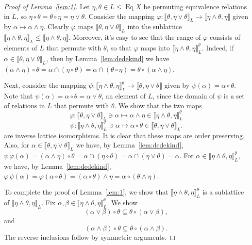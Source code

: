 \documentclass[11pt,reqno]{amsart}
\theoremstyle{plain}
\theoremstyle{definition}
\theoremstyle{remark}
\newcommand{\<}{\ensuremath{\langle}}
\renewcommand{\>}{\ensuremath{\rangle}}
\renewcommand{\phi}{\ensuremath{\varphi}}
\newcommand{\lb}{\ensuremath{\llbracket}}
\newcommand{\rb}{\ensuremath{\rrbracket}}
\renewcommand{\leq}{\ensuremath{\leqslant}}
\newcommand{\meet}{\ensuremath{\wedge}}
\newcommand{\join}{\ensuremath{\vee}}
\newcommand{\Eq}{\ensuremath{\operatorname{Eq}}}
\begin{document}
\begin{proof}[Proof of Lemma~\ref{lem:1}]
Let $\eta, \theta \in L\leq \Eq X$ be permuting equivalence relations in $L$, 
so $\eta \circ \theta = \theta \circ \eta = \eta \join \theta$.
Consider the mapping
$\phi : \lb\theta, \eta \join \theta\rb_L \rightarrow \lb\eta \meet \theta,\eta\rb$ 
given by 
$\alpha \mapsto \alpha \meet \eta$.  Clearly $\phi$ maps $\lb\theta, \eta \join \theta\rb_L$ into the sublattice
$\lb\eta \meet \theta,\eta\rb_L \leq \lb\eta \meet \theta,\eta\rb$.  Moreover,
it's easy to see that the range of $\phi$
consists of elements of $L$ that permute with $\theta$, so that 
$\phi$ maps 
into $\lb\eta \meet \theta, \eta\rb_L^\theta$.
Indeed, if $\alpha \in \lb \theta, \eta 
\join \theta\rb_L$, then by 
Lemma~\ref{lem:dedekind} we have
$(\alpha \meet \eta) \circ \theta = \alpha \cap (\eta\circ \theta) = \alpha \cap
(\theta \circ \eta) = \theta \circ (\alpha \meet \eta)$.

Next, consider the mapping $\psi : \lb \eta\meet \theta, \eta \rb_L^\theta
\rightarrow \lb\theta, \eta\join \theta\rb$ given by $\psi(\alpha) = \alpha
\circ \theta$.  Note that $\psi(\alpha) = \alpha \circ \theta = \alpha \join
\theta$, an element of $L$, since the domain of $\psi$ is a set of
relations in $L$ that permute with $\theta$.
We show that the two maps
\begin{equation}
  \label{eq:phi}
\phi : \lb\theta, \eta \join \theta\rb_L \ni \alpha \longmapsto 
\alpha \meet \eta  \in \lb\eta \meet \theta, \eta\rb_L^\theta
\end{equation}
\begin{equation}
  \label{eq:psi}
\psi :  \lb\eta \meet \theta, \eta\rb^\theta_L \ni \alpha \longmapsto \alpha \circ \theta \in
\lb\theta, \eta \join \theta\rb_L.
\end{equation}
are inverse lattice isomorphisms.  It is clear that these maps are order preserving.
Also, for $\alpha \in \lb\theta, \eta \join \theta\rb_L$ we have, by Lemma~\ref{lem:dedekind},
$\psi\, \phi(\alpha) = (\alpha \meet \eta)\circ \theta = 
\alpha \cap (\eta\circ \theta) = 
\alpha \cap (\eta\join \theta) = \alpha$. For
$\alpha \in \lb\eta \meet \theta, \eta\rb_L^\theta$, we have, by Lemma~\ref{lem:dedekind},
$\phi\, \psi(\alpha) = \phi(\alpha\circ \theta) =  (\alpha
\circ \theta) \meet \eta = \alpha \circ (\theta \meet \eta)$.

To complete the proof of Lemma~\ref{lem:1}, we show that
$\lb\eta \meet \theta, \eta\rb_L^\theta$ is a sublattice of $\lb\eta \meet \theta,
\eta\rb_L$.
Fix $\alpha, \beta \in \lb\eta \meet \theta, \eta\rb_L^\theta$.  We show
\begin{equation}
  \label{eq:i}
  (\alpha \join \beta) \circ \theta \subseteq \theta\circ (\alpha \join \beta),
\end{equation}
and
\begin{equation}
  \label{eq:ii}
  (\alpha \meet \beta) \circ \theta \subseteq \theta\circ (\alpha \meet \beta).
\end{equation}
The reverse inclusions follow by symmetric arguments.


\end{proof}
\end{document}
